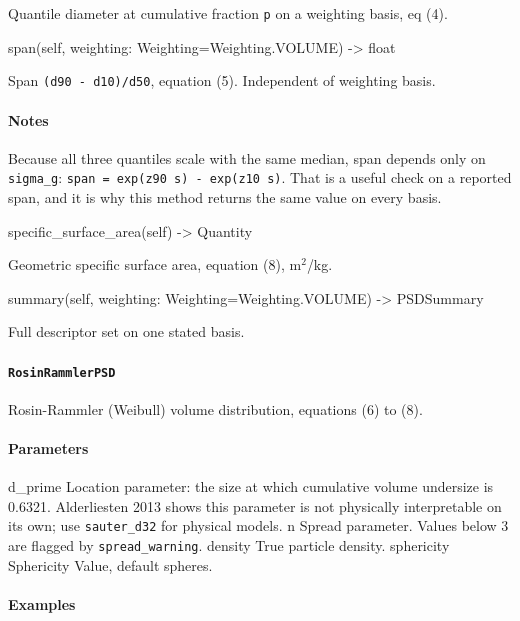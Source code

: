 \documentclass[10pt,a4paper,twoside]{report}
\begin{document}
Quantile diameter at cumulative fraction \texttt{p} on a weighting basis, eq (4).

\begin{verbatimsmall}
span(self, weighting: Weighting=Weighting.VOLUME) -> float
\end{verbatimsmall}

Span \texttt{(d90 - d10)/d50}, equation (5). Independent of weighting basis.

\paragraph*{Notes}

Because all three quantiles scale with the same median, span depends only on \texttt{sigma\_g}: \texttt{span = exp(z90 s) - exp(z10 s)}. That is a useful check on a reported span, and it is why this method returns the same value on every basis.

\begin{verbatimsmall}
specific_surface_area(self) -> Quantity
\end{verbatimsmall}

Geometric specific surface area, equation (8), m$^{2}$/kg.

\begin{verbatimsmall}
summary(self, weighting: Weighting=Weighting.VOLUME) -> PSDSummary
\end{verbatimsmall}

Full descriptor set on one stated basis.

\paragraph{\texttt{RosinRammlerPSD}}

Rosin-Rammler (Weibull) volume distribution, equations (6) to (8).

\paragraph*{Parameters}

d\_prime Location parameter: the size at which cumulative volume undersize is 0.6321. Alderliesten 2013 shows this parameter is not physically interpretable on its own; use \texttt{sauter\_d32} for physical models. n Spread parameter. Values below 3 are flagged by \texttt{spread\_warning}. density True particle density. sphericity Sphericity Value, default spheres.

\paragraph*{Examples}
\end{document}

